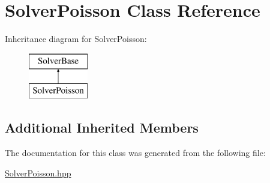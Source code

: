 \hypertarget{class_solver_poisson}{}\section{Solver\+Poisson Class Reference}
\label{class_solver_poisson}
Inheritance diagram for Solver\+Poisson\+:\begin{figure}[H]
\begin{center}
\leavevmode
\includegraphics[height=2.000000cm]{class_solver_poisson}
\end{center}
\end{figure}
\subsection*{Additional Inherited Members}


The documentation for this class was generated from the following file\+:\begin{DoxyCompactItemize}
\item 
\mbox{\hyperlink{_solver_poisson_8hpp}{Solver\+Poisson.\+hpp}}\end{DoxyCompactItemize}

